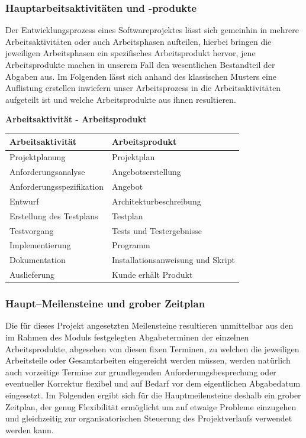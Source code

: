 \documentclass[fontsize=12pt,paper=a4,twoside]{scrartcl}
\begin{document}
\subsubsection{Hauptarbeitsaktivitäten und -produkte}

Der Entwicklungsprozess eines Softwareprojektes lässt sich gemeinhin in mehrere Arbeitsaktivitäten oder auch Arbeitsphasen aufteilen, hierbei bringen die jeweiligen Arbeitsphasen ein spezifisches Arbeitsprodukt hervor, jene Arbeitsprodukte machen in unserem Fall den wesentlichen Bestandteil der Abgaben aus.\newline
Im Folgenden lässt sich anhand des klassischen Musters eine Auflistung erstellen inwiefern unser Arbeitsprozess in die Arbeitsaktivitäten aufgeteilt ist und welche Arbeitsprodukte aus ihnen resultieren.\newline

\textbf{Arbeitsaktivität - Arbeitsprodukt}

\begin{tabular}{|p{7.5cm}|p{7.5cm}|}\hline
   \textbf{Arbeitsaktivität} & \textbf{Arbeitsprodukt}\\ \hline \hline
   Projektplanung & Projektplan \\ \hline
   Anforderungsanalyse & Angebotserstellung\\ \hline
   Anforderungsspezifikation & Angebot\\ \hline
   Entwurf & Architekturbeschreibung\\ \hline
   Erstellung des Testplans & Testplan\\
   Testvorgang & Tests und Testergebnisse\\ \hline
Implementierung & Programm \\ \hline
Dokumentation & Installationsanweisung und Skript\\ \hline
Auslieferung & Kunde erhält Produkt \\ \hline
\end{tabular}


\subsubsection{Haupt--Meilensteine und grober Zeitplan}

Die für dieses Projekt angesetzten Meilensteine resultieren unmittelbar aus den im Rahmen des Moduls festgelegten Abgabeterminen der einzelnen Arbeitsprodukte, abgesehen von diesen fixen Terminen, zu welchen die jeweiligen Arbeitsteile oder Gesamtarbeiten eingereicht werden müssen, werden natürlich auch vorzeitige Termine zur grundlegenden Anforderungsbesprechung oder eventueller Korrektur flexibel und auf Bedarf vor dem eigentlichen Abgabedatum eingesetzt.\newline
Im Folgenden ergibt sich für die Hauptmeilensteine deshalb ein grober Zeitplan, der genug Flexibilität ermöglicht um auf etwaige Probleme einzugehen und gleichzeitig zur organisatorischen Steuerung des Projektverlaufs verwendet werden kann.\newline
\end{document}
